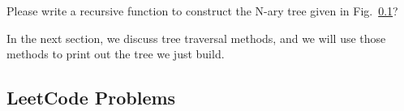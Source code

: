 \documentclass[../main.tex]{subfiles}
\begin{document}
\begin{bclogo}[couleur = blue!30, arrondi=0.1,logo=\bccrayon,ombre=true]{Please write a recursive function to construct the N-ary tree given in Fig.~\ref{}?} 
\end{bclogo}
In the next section, we discuss tree traversal methods, and we will use those methods to print out the tree we just build. 



\subsection{LeetCode Problems}
\end{document}
